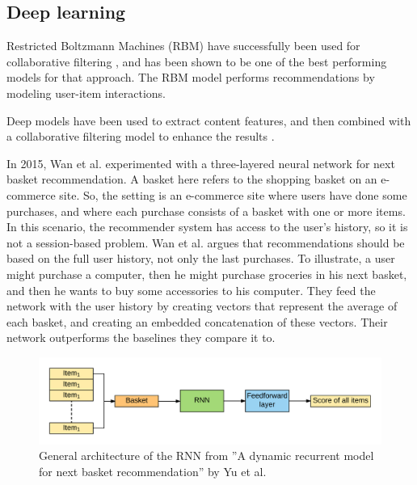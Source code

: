 \subsection{Deep learning}
Restricted Boltzmann Machines (RBM) have successfully been used for collaborative filtering \cite{Salakhutdinov:2007:RBM:1273496.1273596} \cite{DBLP:journals/corr/HidasiKBT15}, and has been shown to be one of the best performing models for that approach. The RBM model performs recommendations by modeling user-item interactions.

Deep models have been used to extract content features, and then combined with a collaborative filtering model to enhance the results \cite{DBLP:journals/corr/WangWY14} \cite{Oord:2013:DCM:2999792.2999907} \cite{DBLP:journals/corr/HidasiKBT15}.

In 2015, Wan et al. \cite{conf/recsys/WanLWGXC15} experimented with a three-layered neural network for next basket recommendation. A basket here refers to the shopping basket on an e-commerce site. So, the setting is an e-commerce site where users have done some purchases, and where each purchase consists of a basket with one or more items. In this scenario, the recommender system has access to the user's history, so it is not a session-based problem. Wan et al. argues that recommendations should be based on the full user history, not only the last purchases. To illustrate, a user might purchase a computer, then he might purchase groceries in his next basket, and then he wants to buy some accessories to his computer. They feed the network with the user history by creating vectors that represent the average of each basket, and creating an embedded concatenation of these vectors. Their network outperforms the baselines they compare it to.

\begin{figure}[htp]
	\centering
	\includegraphics[width=1.0\textwidth]{fig/rnn-next-basket.png}
	\caption{General architecture of the RNN from ''A dynamic recurrent model for next basket recommendation'' by Yu et al. \cite{Yu:2016:DRM:2911451.2914683}}
	\label{fig:rnn-next-basket}
\end{figure}

